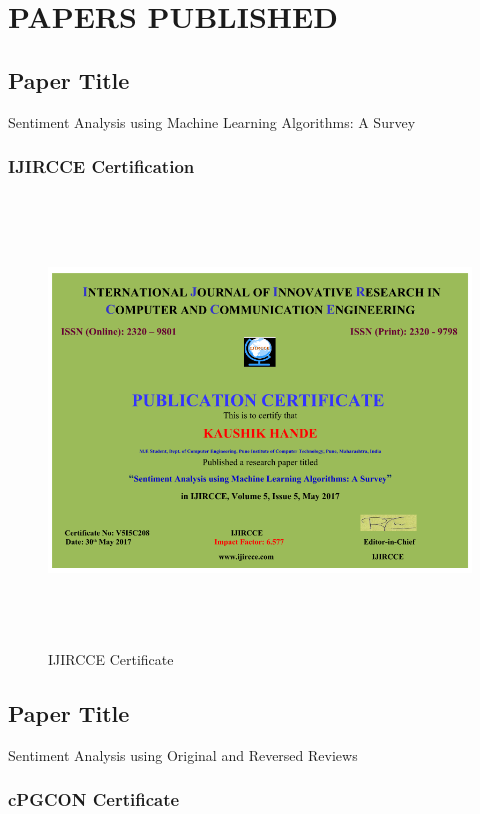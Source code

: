 \documentclass[oneside,a4paper,12pt]{pictreport}
\begin{document}
\appendix
\chapter{PAPERS PUBLISHED}
\section{Paper Title}
Sentiment Analysis using Machine Learning Algorithms: A Survey
\subsection{IJIRCCE Certification}
\begin{figure}[!h]
\includegraphics[width=5.7in,height=4.7in]{ijircce.png}
\caption{IJIRCCE Certificate}
\end{figure}
\section{Paper Title}
Sentiment Analysis using Original and Reversed Reviews
\newpage
\subsection{cPGCON Certificate}
\end{document}
